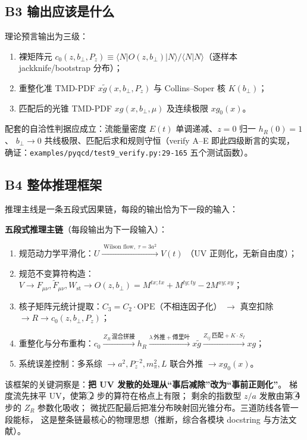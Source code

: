 \documentclass[UTF8]{ctexart}
\begin{document}
\subsection{B3 输出应该是什么}
理论预言输出为三级：
\begin{enumerate}
\item 裸矩阵元 $c_0(z,b_\perp,P_z)\equiv\langle N|O(z,b_\perp)|N\rangle/
\langle N|N\rangle$（逐样本 jackknife/bootstrap 分布）；
\item 重整化准 TMD-PDF $x\tilde g(x,b_\perp,P_z)$ 与 Collins--Soper 核 $K(b_\perp)$；
\item 匹配后的光锥 TMD-PDF $xg(x,b_\perp,\mu)$ 及连续极限 $xg_0(x)$。
\end{enumerate}
配套的自洽性判据应成立：流能量密度 $E(t)$ 单调递减、$z=0$ 归一 $h_R(0)=1$、
$b_\perp\to0$ 共线极限、匹配后求和规则守恒（verify A--E 即此四级断言的实现，
确证：\texttt{\nolinkurl{examples/pyqcd/test9_verify.py:29-165}} 五个测试函数）。

\subsection{B4 整体推理框架}
推理主线是一条五段式因果链，每段的输出恰为下一段的输入：

\begin{keybox}
\textbf{五段式推理主链}（每段输出为下一段输入）：
\begin{enumerate}
\item 规范动力学平滑化：$U\xrightarrow{\;\text{Wilson flow},\;\tau=3a^2\;}V(t)$
（UV 正则化，无新自由度）；
\item 规范不变算符构造：$V\to F_{\mu\nu},\tilde F_{\mu\nu},W_{\mathrm{st}}
\to O(z,b_\perp)=M^{tx;tx}+M^{ty;ty}-2M^{xy;xy}$；
\item 核子矩阵元统计提取：$C_3=C_2\cdot\mathrm{OPE}$（不相连因子化）
$\to$ 真空扣除 $\to R\to c_0(z,b_\perp,P_z)$；
\item 重整化与分布重构：$c_0\xrightarrow{Z_R\,\text{混合拼接}}h_R
\xrightarrow{\lambda\,\text{外推}+\text{傅里叶}}x\tilde g
\xrightarrow{Z_{ij}\,\text{匹配}+K\cdot S_I}xg$；
\item 系统误差控制：多系综 $\to a^2,P_z^{-2},m_\pi^2,L$ 联合外推 $\to xg_0(x)$。
\end{enumerate}
\end{keybox}

该框架的关键洞察是：\textbf{把 UV 发散的处理从``事后减除''改为``事前正则化''}。
梯度流先抹平 UV，使第 \textcircled{\scriptsize 2} 步的算符在格点上有限；
剩余的指数型 $z/a$ 发散由第 \textcircled{\scriptsize 4} 步的 $Z_R$ 参数化吸收；
微扰匹配最后把准分布映射回光锥分布。三道防线各管一段能标，
这是整条链最核心的物理思想（推断，综合各模块 docstring 与方法文献）。
\end{document}
